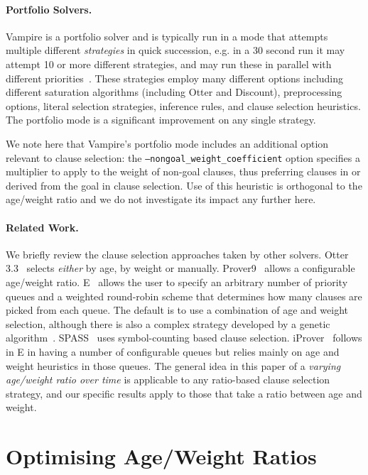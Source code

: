 \documentclass{llncs}
\begin{document}
\paragraph{Portfolio Solvers.}

Vampire is a portfolio solver and is typically run in a mode that attempts multiple different \emph{strategies} in quick succession, e.g. in a 30 second run it may attempt 10 or more different strategies, and may run these in parallel with different priorities~\cite{dynamic-strategy-priority}. These strategies employ many different options including different saturation algorithms (including Otter and Discount), preprocessing options, literal selection strategies, inference rules, and clause selection heuristics. The portfolio mode is a significant improvement on any single strategy. 

We note here that Vampire's portfolio mode includes an additional option relevant to clause selection: the \texttt{--nongoal\_weight\_coefficient} option specifies a multiplier to apply to the weight of non-goal clauses, thus preferring clauses in or derived from the goal in clause selection. Use of this heuristic is orthogonal to the age/weight ratio and we do not investigate its impact any further here.

\paragraph{Related Work.}
We briefly review the clause selection approaches taken by other solvers. 
Otter 3.3~\cite{otter3} selects \emph{either} by age, by weight or manually.
Prover9~\cite{prover9} allows a configurable age/weight ratio.
E~\cite{E} allows the user to specify an arbitrary number of priority queues and a weighted round-robin scheme that determines how many clauses are picked from each queue.
The default is to use a combination of age and weight selection, although there is also a complex strategy developed by a genetic algorithm~\cite{genetic-heuristics}. 
SPASS~\cite{Spass} uses symbol-counting based clause selection. 
iProver~\cite{Iprover} follows in E in having a number of configurable queues but relies mainly on age and weight heuristics in those queues. 
The general idea in this paper of a \emph{varying age/weight ratio over time} is applicable to any ratio-based clause selection strategy, and our specific results apply to those that take a ratio between age and weight.

\section{Optimising Age/Weight Ratios}
\label{sec:awr:study}
\end{document}
